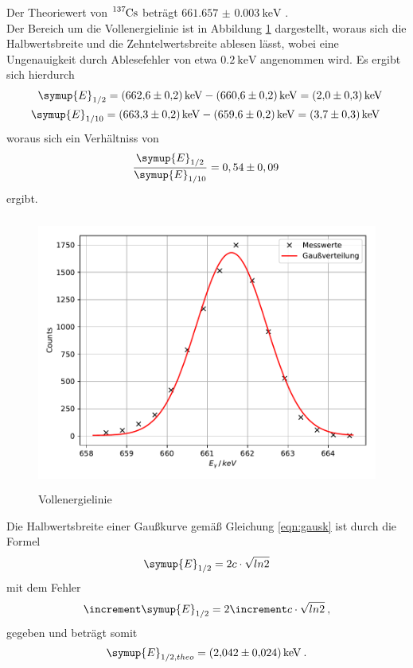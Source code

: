 Der Theoriewert von $\ce{^{137}Cs}$ beträgt $\SI{661.657(3)}{\kilo\electronvolt}$ \cite{lara}. \\
Der Bereich um die Vollenergielinie ist in
Abbildung \ref{fig:plot6} dargestellt, woraus sich die Halbwertsbreite und die
Zehntelwertsbreite ablesen lässt, wobei eine Ungenauigkeit durch
Ablesefehler von etwa $\SI{0.2}{\kilo\electronvolt}$ angenommen wird.
Es ergibt sich hierdurch
\begin{align*}
  \symup{E}_{1/2} = \SI{662.6(2)}{\kilo\electronvolt} -\SI{660.6(2)}{\kilo\electronvolt}
  =\SI{2.0(3)}{\kilo\electronvolt}\\
  \symup{E}_{1/10} = \SI{663.3(2)}{\kilo\electronvolt} -\SI{659.6(2)}{\kilo\electronvolt}
  =\SI{3.7(3)}{\kilo\electronvolt} \:
\end{align*}
woraus sich ein Verhältniss von
\begin{equation}
  \frac{\symup{E}_{1/2}}{\symup{E}_{1/10}} =  0,54 \pm 0,09 \:
\end{equation}
ergibt.
\begin{figure}
  \centering
  \includegraphics[height=9cm]{Plot6.pdf}
  \caption{Vollenergielinie}
  \label{fig:plot6}
\end{figure}
Die Halbwertsbreite einer Gaußkurve gemäß Gleichung \ref{eqn:gausk} ist durch die
Formel
\begin{equation}
  \symup{E}_{1/2} = 2c\cdot\sqrt{ln2}
\end{equation}
mit dem Fehler
\begin{equation}
  \increment \symup{E}_{1/2} = 2\increment c\cdot\sqrt{ln2} \: ,
\end{equation}
gegeben und beträgt somit
\begin{align*}
  \symup{E}_{1/2,theo} = \SI{2.042(24)}{\kilo\electronvolt} \: .
\end{align*}
